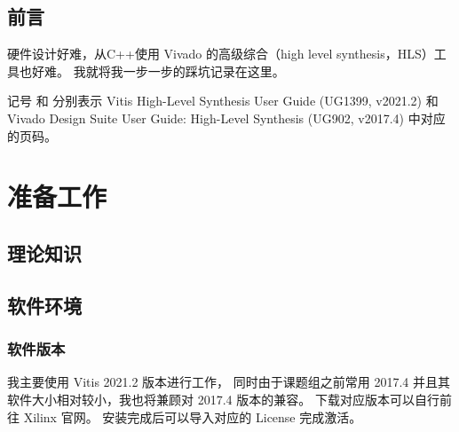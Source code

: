 \documentclass[Chinese,TC,use boldface,simple Names]{beaulivre}
\begin{document}
\frontmatter



\chapter{前言}

  硬件设计好难，从C++使用 Vivado 的高级综合（high level synthesis，HLS）工具也好难。
  我就将我一步一步的踩坑记录在这里。

  记号  和 
  分别表示 Vitis High-Level Synthesis User Guide (UG1399, v2021.2)
  和 Vivado Design Suite User Guide: High-Level Synthesis (UG902, v2017.4)
  中对应的页码。

\tableofcontents

\mainmatter

\part{准备工作}

\chapter{理论知识}

\chapter{软件环境}

  \section{软件版本}

    我主要使用 Vitis 2021.2 版本进行工作，
    同时由于课题组之前常用 2017.4 并且其软件大小相对较小，我也将兼顾对 2017.4 版本的兼容。
    下载对应版本可以自行前往 Xilinx 官网。
    安装完成后可以导入对应的 License 完成激活。
\end{document}

